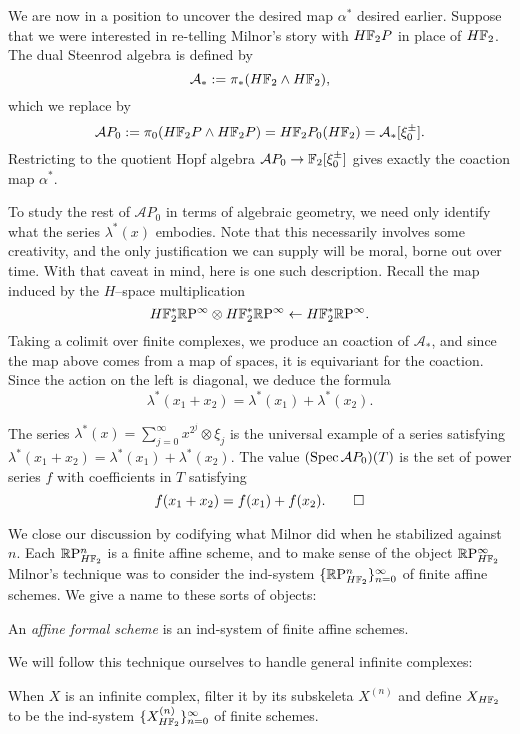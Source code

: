 We are now in a position to uncover the desired map $\alpha^*$ desired earlier.  Suppose that we were interested in re-telling Milnor's story with $H\mathbb F_2P$ in place of $H\mathbb F_2$.  The dual Steenrod algebra is defined by \[\mathcal A_* := \pi_*(H\mathbb F_2 \wedge H\mathbb F_2),\] which we replace by \[\mathcal AP_0 := \pi_0 (H\mathbb F_2 P \wedge H\mathbb F_2 P) = H\mathbb F_2P_0(H\mathbb F_2) = \mathcal A_*[\xi_0^\pm].\]  Restricting to the quotient Hopf algebra $\mathcal AP_0 \to \mathbb F_2[\xi_0^\pm]$ gives exactly the coaction map $\alpha^*$.

To study the rest of $\mathcal AP_0$ in terms of algebraic geometry, we need only identify what the series $\lambda^*(x)$ embodies.  Note that this necessarily involves some creativity, and the only justification we can supply will be moral, borne out over time.  With that caveat in mind, here is one such description.  Recall the map induced by the $H$--space multiplication \[H\mathbb F_2^* \mathbb R\mathrm P^\infty \otimes H\mathbb F_2^* \mathbb R\mathrm P^\infty \leftarrow H\mathbb F_2^* \mathbb R\mathrm P^\infty.\]  Taking a colimit over finite complexes, we produce an coaction of $\mathcal A_*$, and since the map above comes from a map of spaces, it is equivariant for the coaction.  Since the action on the left is diagonal, we deduce the formula \[\lambda^*(x_1 + x_2) = \lambda^*(x_1) + \lambda^*(x_2).\]

\begin{lemma}
The series $\lambda^*(x) = \sum_{j=0}^\infty x^{2^j} \otimes \xi_j$ is the universal example of a series satisfying $\lambda^*(x_1 + x_2) = \lambda^*(x_1) + \lambda^*(x_2)$.  The value $(\operatorname{Spec} \mathcal AP_0)(T)$ is the set of power series $f$ with coefficients in $T$ satisfying \[f(x_1 + x_2) = f(x_1) + f(x_2). \qed\]
\end{lemma}

We close our discussion by codifying what Milnor did when he stabilized against $n$.  Each $\mathbb R\mathrm P^n_{H\mathbb F_2}$ is a finite affine scheme, and to make sense of the object $\mathbb R\mathrm P^\infty_{H\mathbb F_2}$ Milnor's technique was to consider the ind-system $\{\mathbb R\mathrm P^n_{H\mathbb F_2}\}_{n=0}^\infty$ of finite affine schemes.  We give a name to these sorts of objects:
\begin{definition}
An \textit{affine formal scheme} is an ind-system of finite affine schemes.
\end{definition}
\noindent We will follow this technique ourselves to handle general infinite complexes:
\begin{definition}
When $X$ is an infinite complex, filter it by its subskeleta $X^{(n)}$ and define $X_{H\mathbb F_2}$ to be the ind-system $\{X^{(n)}_{H\mathbb F_2}\}_{n=0}^\infty$ of finite schemes.
\end{definition}

